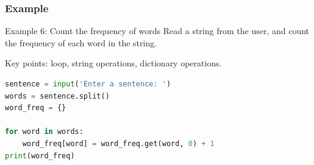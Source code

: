 \documentclass[beamer, en, version=2.0]{huangfusl-template}
\begin{document}
    \begin{frame}[fragile]
        \frametitle{Example}

        \begin{block}{Example 6: Count the frequency of words}
            Read a string from the user, and count the frequency of each word in the string.
        \end{block}

        Key points: loop, string operations, dictionary operations.

        \pause

\begin{lstlisting}[language=python]
sentence = input('Enter a sentence: ')
words = sentence.split()
word_freq = {}

for word in words:
    word_freq[word] = word_freq.get(word, 0) + 1
print(word_freq)
\end{lstlisting}

    \end{frame}
\end{document}

